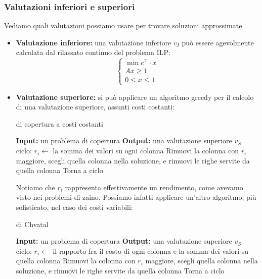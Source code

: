 \documentclass[a4paper,11pt]{article}
\begin{document}
\subsubsection{Valutazioni inferiori e superiori}
Vediamo quali valutazioni possiamo usare per trovare soluzioni approssimate. 
\begin{itemize}
	\item \textbf{Valutazione inferiore:} una valutazione inferiore $v_I$ può essere agevolmente calcolata dal rilassato continuo del problema ILP:
		\[
			\begin{cases}
				\min c^\intercal \cdot x \\ 
				Ax \geq 1 \\ 
				0 \leq x \leq 1
			\end{cases}
		\]
	\item \textbf{Valutazione superiore:} si può applicare un algoritmo greedy per il calcolo di una valutazione superiore, assunti costi costanti:
\begin{algorithm}[H]
\caption{di copertura a costi costanti}
\begin{algorithmic}
	\STATE \textbf{Input:} un problema di copertura %
	\STATE \textbf{Output:} una valutazione superiore $v_S$ %
	\STATE \textsf{ciclo:}
	\STATE $r_i \leftarrow$ la somma dei valori su ogni colonna
	\STATE Rimuovi la colonna con $r_i$ maggiore, scegli quella colonna nella soluzione, e rimuovi le righe servite da quella colonna
	\STATE Torna a \textsf{ciclo}
\end{algorithmic}
\end{algorithm}
Notiamo che $r_i$ rappresenta effettivamente un rendimento, come avevamo visto nei problemi di zaino.
Possiamo infatti applicare un'altro algoritmo, più sofisticato, nel caso dei costi variabili:
	\begin{algorithm}[H]
\caption{di Chvatal}
\begin{algorithmic}
	\STATE \textbf{Input:} un problema di copertura %
	\STATE \textbf{Output:} una valutazione superiore $v_S$%
	\STATE \textsf{ciclo:}
	\STATE $r_i \leftarrow$ il rapporto fra il costo di ogni colonna e la somma dei valori su quella colonna
	\STATE Rimuovi la colonna con $r_i$ maggiore, scegli quella colonna nella soluzione, e rimuovi le righe servite da quella colonna
	\STATE Torna a \textsf{ciclo}
\end{algorithmic}
\end{algorithm}
\end{itemize}
\end{document}
